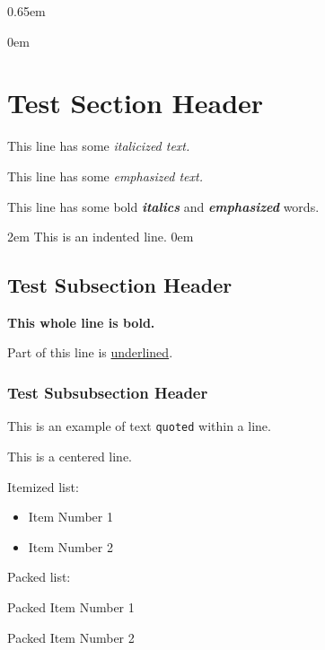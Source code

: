 %
%





\parskip0.65em

\parindent0em

\section{Test Section Header}

This line has some {\it italicized text.}

This line has some {\em emphasized text.}

This line has some bold {\bf {\it italics}} and {\bf {\em emphasized}} words.

\parindent2em
This is an indented line.
\parindent0em

\subsection{Test Subsection Header}

{\bf This whole line is bold.}

Part of this line is \underline {underlined}.

\subsubsection{Test Subsubsection Header}

This is an example of text \verb"quoted" within a line.

\begin{center}
This is a centered line.
\end{center}

Itemized list:
\begin{itemize}
\item Item Number 1
\item Item Number 2
\end{itemize}

Packed list:
\begin{packed}
\item Packed Item Number 1
\item Packed Item Number 2
\end{packed}

